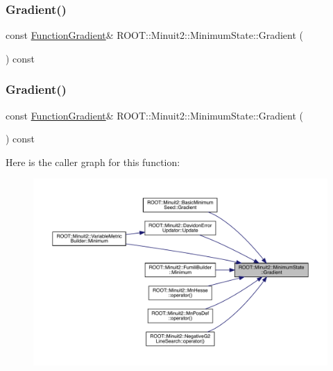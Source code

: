 \subsubsection{\texorpdfstring{Gradient()}{Gradient()}\hspace{0.1cm}{\footnotesize\ttfamily [1/2]}}
{\footnotesize\ttfamily const \mbox{\hyperlink{classROOT_1_1Minuit2_1_1FunctionGradient}{Function\+Gradient}}\& R\+O\+O\+T\+::\+Minuit2\+::\+Minimum\+State\+::\+Gradient (\begin{DoxyParamCaption}{ }\end{DoxyParamCaption}) const\hspace{0.3cm}{\ttfamily [inline]}}

\mbox{\label{classROOT_1_1Minuit2_1_1MinimumState_a08a0d667e1f89522a29c49c9c02e642d}} 
\subsubsection{\texorpdfstring{Gradient()}{Gradient()}\hspace{0.1cm}{\footnotesize\ttfamily [2/2]}}
{\footnotesize\ttfamily const \mbox{\hyperlink{classROOT_1_1Minuit2_1_1FunctionGradient}{Function\+Gradient}}\& R\+O\+O\+T\+::\+Minuit2\+::\+Minimum\+State\+::\+Gradient (\begin{DoxyParamCaption}{ }\end{DoxyParamCaption}) const\hspace{0.3cm}{\ttfamily [inline]}}

Here is the caller graph for this function\+:\nopagebreak
\begin{figure}[H]
\begin{center}
\leavevmode
\includegraphics[width=350pt]{db/dcd/classROOT_1_1Minuit2_1_1MinimumState_a08a0d667e1f89522a29c49c9c02e642d_icgraph}
\end{center}
\end{figure}
\mbox{\label{classROOT_1_1Minuit2_1_1MinimumState_aba1e55d52217a591657dba0cc9fa8c9c}} 
